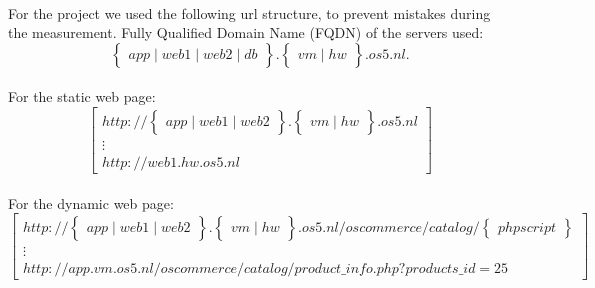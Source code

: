 \paragraph{}
For the project we used the following url structure, to prevent mistakes during the measurement. Fully Qualified Domain Name (FQDN) of the servers used:
$$\begin{Bmatrix}app \mid web1 \mid web2 \mid db \end{Bmatrix} .  \begin{Bmatrix} vm \mid hw \end{Bmatrix} . os5 . nl .$$
\paragraph{}
For the static web page:\\
$$ \begin{bmatrix}
 http://  \begin{Bmatrix}app \mid web1 \mid web2 \end{Bmatrix} .  \begin{Bmatrix} vm \mid hw \end{Bmatrix} . os5 . nl 
  \\ \vdots \\ http://web1.hw.os5.nl
\end{bmatrix}$$
\paragraph{}
For the dynamic web page:\\
$$ \begin{bmatrix}
http://  \begin{Bmatrix}app \mid web1 \mid web2 \end{Bmatrix} .  \begin{Bmatrix} vm \mid hw \end{Bmatrix} . os5 . nl /  oscommerce / catalog / \begin{Bmatrix} php script \end{Bmatrix}   \\ \vdots \\
http://  app .  vm . os5 . nl /  oscommerce / catalog / product\_info.php?products\_id=25   
\end{bmatrix}$$